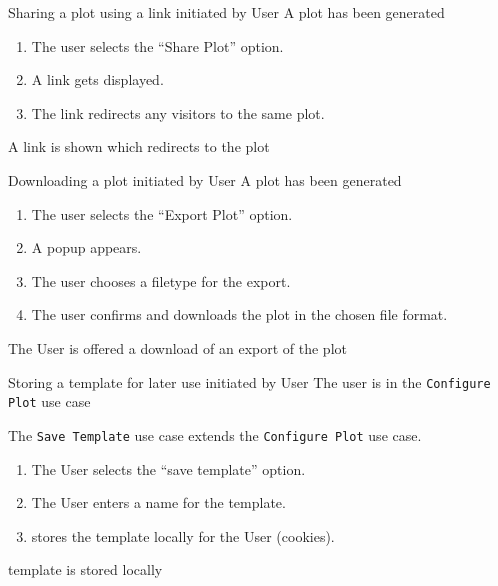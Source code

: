 \bigskip

{Sharing a \gls{plot} using a link}
{initiated by User}
{A \gls{plot} has been generated}
{\begin{enumerate}
    \item The user selects the \enquote{Share Plot} option.
    \item A link gets displayed.
    \item The link redirects any visitors to the same \gls{plot}.
\end{enumerate}}
{A link is shown which redirects to the \gls{plot}}

\bigskip

{Downloading a plot}
{initiated by User}
{A \gls{plot} has been generated}
{\begin{enumerate}
    \item The user selects the \enquote{Export Plot} option.
    \item A popup appears.
    \item The user chooses a filetype for the export.
    \item The user confirms and downloads the \gls{plot} in the chosen file format.
\end{enumerate}}
{The User is offered a download of an export of the \gls{plot}}

\bigskip

{Storing a \gls{template} for later use}
{initiated by User}
{The user is in the \texttt{Configure Plot} use case}
{The \texttt{Save Template} use case extends the \texttt{Configure Plot} use case.
\begin{enumerate}
    \item The User selects the \enquote{save template} option.
    \item The User enters a name for the \gls{template}.
    \item \parkview{} stores the template locally for the User (cookies).
\end{enumerate}}
{\Gls{template} is stored locally}

\bigskip

